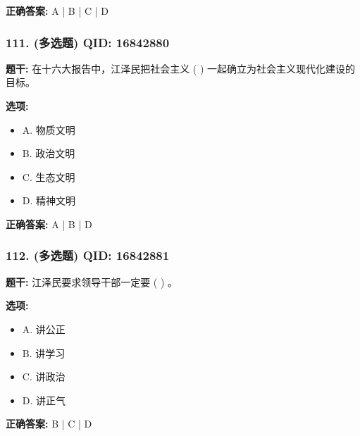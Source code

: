 \documentclass[12pt,UTF8]{ctexart}
\begin{document}
\textbf{正确答案:}
A | B | C | D

\vspace{0.3em}\hrulefill\vspace{0.7em}

\subsubsection*{111. (多选题) \small QID: 16842880}

\textbf{题干:}
在十六大报告中，江泽民把社会主义 ( ) 一起确立为社会主义现代化建设的目标。

\textbf{选项:}
\begin{itemize}[leftmargin=*]

  \item A. 物质文明

  \item B. 政治文明

  \item C. 生态文明

  \item D. 精神文明

\end{itemize}

\textbf{正确答案:}
A | B | D

\vspace{0.3em}\hrulefill\vspace{0.7em}

\subsubsection*{112. (多选题) \small QID: 16842881}

\textbf{题干:}
江泽民要求领导干部一定要 ( ) 。

\textbf{选项:}
\begin{itemize}[leftmargin=*]

  \item A. 讲公正

  \item B. 讲学习

  \item C. 讲政治

  \item D. 讲正气

\end{itemize}

\textbf{正确答案:}
B | C | D

\vspace{0.3em}\hrulefill\vspace{0.7em}
\end{document}
